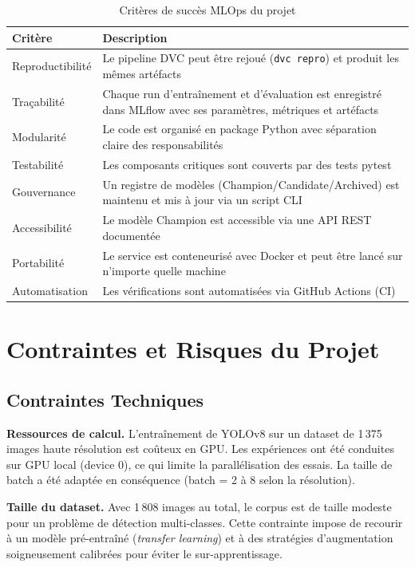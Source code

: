 \documentclass{rapportENSIAS}
\begin{document}
\begin{table}[H]
\centering
\caption{Critères de succès MLOps du projet}
\label{tab:criteres_mlops}
\begin{tabular}{p{5cm} p{9cm}}
\toprule
\textbf{Critère} & \textbf{Description} \\
\midrule
Reproductibilité & Le pipeline DVC peut être rejoué (\texttt{dvc repro}) et produit les mêmes artéfacts \\
Traçabilité & Chaque run d'entraînement et d'évaluation est enregistré dans MLflow avec ses paramètres, métriques et artéfacts \\
Modularité & Le code est organisé en package Python avec séparation claire des responsabilités \\
Testabilité & Les composants critiques sont couverts par des tests pytest \\
Gouvernance & Un registre de modèles (Champion/Candidate/Archived) est maintenu et mis à jour via un script CLI \\
Accessibilité & Le modèle Champion est accessible via une API REST documentée \\
Portabilité & Le service est conteneurisé avec Docker et peut être lancé sur n'importe quelle machine \\
Automatisation & Les vérifications sont automatisées via GitHub Actions (CI) \\
\bottomrule
\end{tabular}
\end{table}

\section{Contraintes et Risques du Projet}

\subsection{Contraintes Techniques}

\textbf{Ressources de calcul.} L'entraînement de YOLOv8 sur un dataset de 1\,375 images haute résolution est coûteux en GPU. Les expériences ont été conduites sur GPU local (device 0), ce qui limite la parallélisation des essais. La taille de batch a été adaptée en conséquence (batch = 2 à 8 selon la résolution).

\textbf{Taille du dataset.} Avec 1\,808 images au total, le corpus est de taille modeste pour un problème de détection multi-classes. Cette contrainte impose de recourir à un modèle pré-entraîné (\textit{transfer learning}) et à des stratégies d'augmentation soigneusement calibrées pour éviter le sur-apprentissage.
\end{document}
